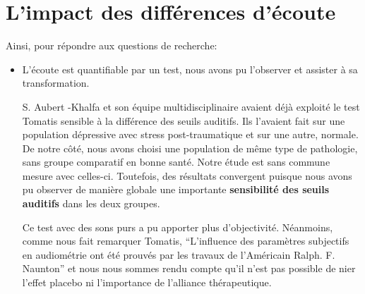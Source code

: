  \section{ L'impact des différences d'écoute }
  Ainsi, pour répondre aux questions de recherche:
  \begin{itemize}
       \item
          L'écoute est quantifiable  par un test, nous avons pu l'observer et  assister à sa
  transformation.
  
  S. Aubert -Khalfa et son équipe multidisciplinaire \autocite{affectiveDisorders} avaient déjà
  exploité le test Tomatis  sensible à la différence des
  seuils auditifs. Ils l'avaient fait sur une population
  dépressive avec stress post-traumatique et sur une autre, normale. De notre côté, nous avons choisi
  une population de même type de pathologie, sans
  groupe comparatif en bonne santé. Notre étude est sans commune mesure avec celles-ci. Toutefois, 
  des résultats convergent puisque nous avons pu observer de manière globale une importante 
 \textbf{ sensibilité des seuils auditifs} dans les deux groupes.
 
 
 Ce test avec des sons purs a pu apporter plus d'objectivité. Néanmoins, comme nous fait remarquer 
 Tomatis,
  \enquote{L'influence des paramètres subjectifs en audiométrie ont été prouvés par les travaux de 
 l'Américain Ralph. F. Naunton}  \autocite [69]{tomatisoreilletvie}
 et  nous nous sommes rendu compte qu'il n'est pas possible de nier l'effet placebo ni l'importance de  
 l'alliance 
 thérapeutique. 
 

\end{itemize}
